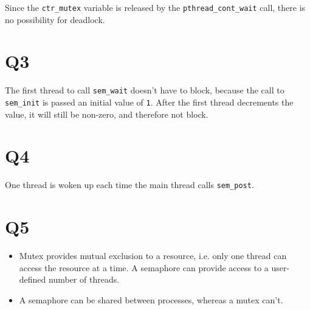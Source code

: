 \documentclass[runningheads,a4paper]{report}
\begin{document}
Since the \texttt{ctr\_mutex} variable is released by the
\texttt{pthread\_cont\_wait} call, there is no possibility for
deadlock.

\section*{Q3}

The first thread to call \texttt{sem\_wait} doesn't have to block,
because the call to \texttt{sem\_init} is passed an initial value of
\texttt{1}. After the first thread decrements the value, it
will still be non-zero, and therefore not block.

\section*{Q4}

One thread is woken up each time the main thread calls
\texttt{sem\_post}.

\section*{Q5}

\begin{itemize}
  \item Mutex provides mutual exclusion to a resource, i.e. only one
    thread can access the resource at a time. A semaphore can provide
    access to a user-defined number of threads.
  \item A semaphore can be shared between processes, whereas a mutex
    can't.
\end{itemize}
\end{document}
